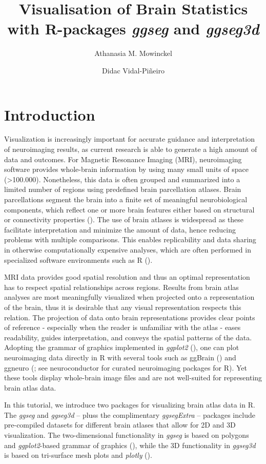 \documentclass[fleqn,10pt]{wlpeerj} %
\title{Visualisation of Brain Statistics with R-packages \emph{ggseg} and \emph{ggseg3d}}
\author[1]{Athanasia M. Mowinckel}
\author[1]{Didac Vidal-Piñeiro}
\affil[1]{Center for Lifespan Changes in Brain and Cognition, Univeristy of Oslo, PO. box 1094 Blindern, 0317 Oslo, Norway}
\begin{document}
\flushbottom
\maketitle
\thispagestyle{empty}

\hypertarget{introduction}{%
\section{Introduction}\label{introduction}}

Visualization is increasingly important for accurate guidance and interpretation of neuroimaging results, as current research is able to generate a high amount of data and outcomes.
For Magnetic Resonance Imaging (MRI), neuroimaging software provides whole-brain information by using many small units of space (\textgreater100.000).
Nonetheless, this data is often grouped and summarized into a limited number of regions using predefined brain parcellation atlases.
Brain parcellations segment the brain into a finite set of meaningful neurobiological components, which reflect one or more brain features either based on structural or connectivity properties (\citet{eickhoff_2018}).
The use of brain atlases is widespread as these facilitate interpretation and minimize the amount of data, hence reducing problems with multiple comparisons.
This enables replicability and data sharing in otherwise computationally expensive analyses, which are often performed in specialized software environments such as R (\citet{R}).

MRI data provides good spatial resolution and thus an optimal representation has to respect spatial relationships across regions.
Results from brain atlas analyses are most meaningfully visualized when projected onto a representation of the brain, thus it is desirable that any visual representation respects this relation.
The projection of data onto brain representations provides clear points of reference - especially when the reader is unfamiliar with the atlas - eases readability, guides interpretation, and conveys the spatial patterns of the data.
Adopting the grammar of graphics implemented in \emph{ggplot2} (\citet{ggplot}), one can plot neuroimaging data directly in R with several tools such as ggBrain (\citet{ggBrain}) and ggneuro (\citet{ggneuro}; see neuroconductor \citeyearpar{neuroconductor} for curated neuroimaging packages for R).
Yet these tools display whole-brain image files and are not well-suited for representing brain atlas data.

In this tutorial, we introduce two packages for visualizing brain atlas data in R.
The \emph{ggseg} and \emph{ggseg3d} -- pluss the complimentary \emph{ggsegExtra} -- packages include pre-compiled datasets for different brain atlases that allow for 2D and 3D visualization.
The two-dimensional functionality in \emph{ggseg} is based on polygons and \emph{ggplot2}-based grammar of graphics (\citet{ggplot}), while the 3D functionality in \emph{ggseg3d} is based on tri-surface mesh plots and \emph{plotly} (\citet{plotly}).
\end{document}
